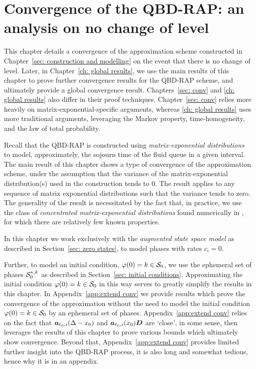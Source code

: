 \chapter{Convergence of the QBD-RAP: an analysis on no change of level\label{sec: conv}}
This chapter details a convergence of the approximation scheme constructed in Chapter~\ref{sec: construction and modelling} on the event that there is no change of level. Later, in Chapter~\ref{ch: global results}, we use the main results of this chapter to prove further convergence results for the QBD-RAP scheme, and ultimately provide a global convergence result. Chapters~\ref{sec: conv} and \ref{ch: global results} also differ in their proof techniques. Chapter~\ref{sec: conv} relies more heavily on matrix-exponential-specific arguments, whereas \ref{ch: global results} uses more traditional arguments, leveraging the Markov property, time-homogeneity, and the law of total probability.

Recall that the QBD-RAP is constructed using \emph{matrix-exponential distributions} to model, approximately, the sojourn time of the fluid queue in a given interval. The main result of this chapter shows a type of convergence of the approximation scheme, under the assumption that the variance of the matrix-exponential distribution(s) used in the construction tends to 0.  
The result applies to any sequence of matrix exponential distributions such that the variance tends to zero. The generality of the result is necessitated by the fact that, in practice, we use the class of \emph{concentrated matrix-exponential distributions} found numerically in \citep{hht2020}, for which there are relatively few known properties.

In this chapter we work exclusively with the \emph{augmented state space model} as described in Section~\ref{sec: zero states}, to model phases with rates \(c_i=0\). 

Further, to model an initial condition, \(\varphi(0)=k\in\mathcal{S}_0\), we use the ephemeral set of phases \(\mathcal{S}_0^{*,k}\) as described in Section~\ref{sec: initial conditions}. Approximating the initial condition \(\varphi(0)=k\in\mathcal{S}_0\) in this way serves to greatly simplify the results in this chapter. In Appendix~\ref{app:extend conv} we provide results which prove the convergence of the approximation without the need to model the initial condition \(\varphi(0)=k\in\mathcal{S}_0\) by an ephemeral set of phases. Appendix~\ref{app:extend conv} relies on the fact that \(\boldsymbol a_{\ell_0,i}(\Delta - x_0)\) and \(\boldsymbol a_{\ell_0,i}(x_0)\boldsymbol D\) are `close', in some sense, then leverages the results of this chapter to prove various bounds which ultimately show convergence. Beyond that, Appendix~\ref{app:extend conv} provides limited further insight into the QBD-RAP process, it is also long and somewhat tedious, hence why it is in an appendix. 

